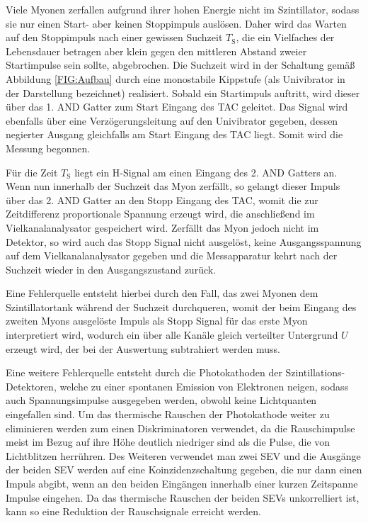 Viele Myonen zerfallen aufgrund ihrer hohen Energie nicht im Szintillator, sodass sie nur einen Start- aber keinen Stoppimpuls auslösen. Daher wird das Warten auf den Stoppimpuls nach einer gewissen Suchzeit $T_{\textrm{S}}$, die ein Vielfaches der Lebensdauer betragen aber klein gegen den mittleren Abstand zweier Startimpulse sein sollte, abgebrochen. Die Suchzeit wird in der Schaltung gemäß Abbildung \ref{FIG:Aufbau} durch eine monostabile Kippstufe (als Univibrator in der Darstellung bezeichnet) realisiert. Sobald ein Startimpuls auftritt, wird dieser über das 1. AND Gatter zum Start Eingang des TAC geleitet. Das Signal wird ebenfalls über eine Verzögerungsleitung auf den Univibrator gegeben, dessen negierter Ausgang gleichfalls am Start Eingang des TAC liegt. Somit wird die Messung begonnen.

Für die Zeit $T_{\textrm{S}}$ liegt ein H-Signal am einen Eingang des 2. AND Gatters an. Wenn nun innerhalb der Suchzeit das Myon zerfällt, so gelangt dieser Impuls über das 2. AND Gatter an den Stopp Eingang des TAC, womit die zur Zeitdifferenz proportionale Spannung erzeugt wird, die anschließend im Vielkanalanalysator gespeichert wird. Zerfällt das Myon jedoch nicht im Detektor, so wird auch das Stopp Signal nicht ausgelöst, keine Ausgangsspannung auf dem Vielkanalanalysator gegeben und die Messapparatur kehrt nach der Suchzeit wieder in den Ausgangszustand zurück.

Eine Fehlerquelle entsteht hierbei durch den Fall, das zwei Myonen dem Szintillatortank während der Suchzeit durchqueren, womit der beim Eingang des zweiten Myons ausgelöste Impuls als Stopp Signal für das erste Myon interpretiert wird, wodurch ein über alle Kanäle gleich verteilter Untergrund $U$ erzeugt wird, der bei der Auswertung subtrahiert werden muss.

Eine weitere Fehlerquelle entsteht durch die Photokathoden der Szintillations-Detektoren, welche zu einer spontanen Emission von Elektronen neigen, sodass auch Spannungsimpulse ausgegeben werden, obwohl keine Lichtquanten eingefallen sind. Um das thermische Rauschen der Photokathode weiter zu eliminieren werden zum einen Diskriminatoren verwendet, da die Rauschimpulse meist im Bezug auf ihre Höhe deutlich niedriger sind als die Pulse, die von Lichtblitzen herrühren. Des Weiteren verwendet man zwei SEV und  die Ausgänge der beiden SEV werden auf eine Koinzidenzschaltung gegeben, die nur dann einen Impuls abgibt, wenn an den beiden Eingängen innerhalb einer kurzen Zeitspanne Impulse eingehen. Da das thermische Rauschen der beiden SEVs unkorrelliert ist, kann so eine Reduktion der Rauschsignale erreicht werden.

